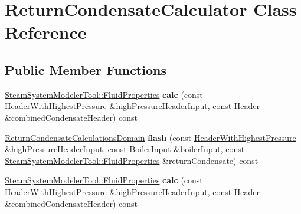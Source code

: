 \hypertarget{class_return_condensate_calculator}{}\section{Return\+Condensate\+Calculator Class Reference}
\label{class_return_condensate_calculator}
\subsection*{Public Member Functions}
\begin{DoxyCompactItemize}
\item 
\mbox{\label{class_return_condensate_calculator_a091b6d5fd24ffe00835cdf590024545d}} 
\hyperlink{struct_steam_system_modeler_tool_1_1_fluid_properties}{Steam\+System\+Modeler\+Tool\+::\+Fluid\+Properties} {\bfseries calc} (const \hyperlink{class_header_with_highest_pressure}{Header\+With\+Highest\+Pressure} \&high\+Pressure\+Header\+Input, const \hyperlink{class_header}{Header} \&combined\+Condensate\+Header) const
\item 
\mbox{\label{class_return_condensate_calculator_a60e044367cfec76fb4c18a998f65a9a5}} 
\hyperlink{class_return_condensate_calculations_domain}{Return\+Condensate\+Calculations\+Domain} {\bfseries flash} (const \hyperlink{class_header_with_highest_pressure}{Header\+With\+Highest\+Pressure} \&high\+Pressure\+Header\+Input, const \hyperlink{class_boiler_input}{Boiler\+Input} \&boiler\+Input, const \hyperlink{struct_steam_system_modeler_tool_1_1_fluid_properties}{Steam\+System\+Modeler\+Tool\+::\+Fluid\+Properties} \&return\+Condensate) const
\item 
\mbox{\label{class_return_condensate_calculator_a091b6d5fd24ffe00835cdf590024545d}} 
\hyperlink{struct_steam_system_modeler_tool_1_1_fluid_properties}{Steam\+System\+Modeler\+Tool\+::\+Fluid\+Properties} {\bfseries calc} (const \hyperlink{class_header_with_highest_pressure}{Header\+With\+Highest\+Pressure} \&high\+Pressure\+Header\+Input, const \hyperlink{class_header}{Header} \&combined\+Condensate\+Header) const
\item 
\mbox{\label{class_return_condensate_calculator_a60e044367cfec76fb4c18a998f65a9a5}} 

\end{DoxyCompactItemize}
